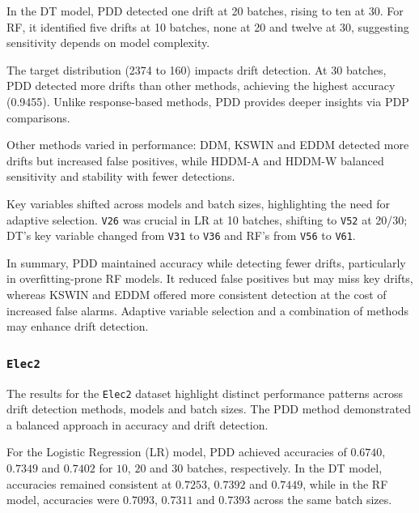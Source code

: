 In the DT model, PDD detected one drift at 20 batches, rising to ten at 30. For RF, it identified five drifts at 10 batches, none at 20 and twelve at 30, suggesting sensitivity depends on model complexity.

The target distribution (2374 to 160) impacts drift detection. At 30 batches, PDD detected more drifts than other methods, achieving the highest accuracy (0.9455). Unlike response-based methods, PDD provides deeper insights via PDP comparisons.

Other methods varied in performance: DDM, KSWIN and EDDM detected more drifts but increased false positives, while HDDM-A and HDDM-W balanced sensitivity and stability with fewer detections.

Key variables shifted across models and batch sizes, highlighting the need for adaptive selection. \texttt{V26} was crucial in LR at 10 batches, shifting to \texttt{V52} at 20/30; DT's key variable changed from \texttt{V31} to \texttt{V36} and RF's from \texttt{V56} to \texttt{V61}.

In summary, PDD maintained accuracy while detecting fewer drifts, particularly in overfitting-prone RF models. It reduced false positives but may miss key drifts, whereas KSWIN and EDDM offered more consistent detection at the cost of increased false alarms. Adaptive variable selection and a combination of methods may enhance drift detection.

\hypertarget{section-4}{%
\subsubsection{\texorpdfstring{\texttt{Elec2}}{}}\label{section-4}}

The results for the \texttt{Elec2} dataset highlight distinct performance patterns across drift detection methods, models and batch sizes. The PDD method demonstrated a balanced approach in accuracy and drift detection.

For the Logistic Regression (LR) model, PDD achieved accuracies of \(0.6740\), \(0.7349\) and \(0.7402\) for \(10\), \(20\) and \(30\) batches, respectively. In the DT model, accuracies remained consistent at \(0.7253\), \(0.7392\) and \(0.7449\), while in the RF model, accuracies were \(0.7093\), \(0.7311\) and \(0.7393\) across the same batch sizes.

